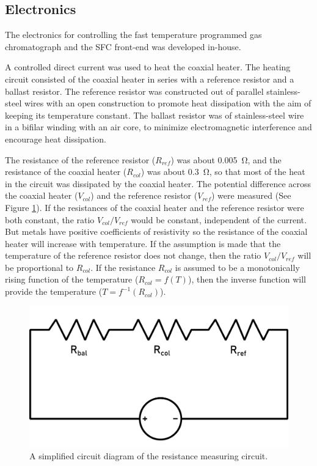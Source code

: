 \documentclass[aip,rsi,preprint,graphicx]{revtex4-1} %
\begin{document}
\subsection{Electronics}

The electronics for controlling the fast temperature programmed gas
chromatograph and the SFC front-end was developed in-house.

A controlled direct current was used to heat the coaxial heater. The heating
circuit consisted of the coaxial heater in series with a reference resistor and
a ballast resistor. The reference resistor was constructed out of parallel
stainless-steel wires with an open construction to promote heat dissipation with
the aim of keeping its temperature constant. The ballast resistor was of
stainless-steel wire in a bifilar winding with an air core, to minimize
electromagnetic interference and encourage heat dissipation.

The resistance of the reference resistor ($R_{ref}$) was about \SI{0.005}{\ohm},
and the resistance of the coaxial heater ($R_{col}$) was about  \SI{0.3}{\ohm}, so
that most of the heat in the circuit was dissipated by the coaxial heater.
The potential difference across the coaxial heater ($V_{col}$) and the reference
resistor ($V_{ref}$) were measured (See Figure \ref{Circuit}). If the
resistances of the coaxial heater and the reference resistor were both constant,
the ratio $V_{col}/V_{ref}$ would be constant, independent of the current.
But metals have positive coefficients of resistivity so the resistance of the
coaxial heater will increase with temperature. If the assumption is made that
the temperature of the reference resistor does not change, then the ratio
$V_{col}/V_{ref}$ will be proportional to $R_{col}$. If the resistance $R_{col}$ is
assumed to be a monotonically rising function of the temperature ($R_{col} = f(T)$),
then the inverse function will provide the temperature ($T = f^{-1}(R_{col})$).


\begin{figure}
\includegraphics[width=\textwidth]{./Figures/ResistanceMeasurement.pdf}%
\caption{\label{Circuit}A simplified circuit diagram of the resistance measuring circuit.}%
\end{figure}
\end{document}
